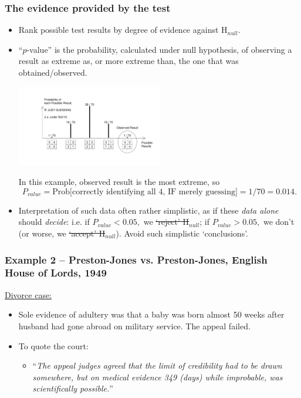 \documentclass{beamer}\usepackage[]{graphicx}\usepackage[]{color}
\begin{document}
\begin{frame}
\frametitle{The evidence provided by the test}

\begin{footnotesize}
\begin{itemize}
\item
Rank possible test
results by  degree of evidence against H$_{null}$. 
\item ``$p$-value'' is the probability, calculated under null hypothesis, of
observing a result as  extreme as, or more extreme than, the one that was obtained/observed.
\begin{center}
	\includegraphics[width=2.5in]{ProbResults.pdf}
\end{center}
\pause
In this example, observed result is the most extreme, so
$$P_{value}=\textrm{Prob[correctly identifying all 4, IF merely guessing]} = 1/70 = 0.014.$$ \pause
\item
Interpretation of such data  often  rather simplistic, as if these \textit{data alone} should \textit{decide}:  i.e. if $P_{value} < 0.05,$ we \sout{`reject' H}$_{null}$; if $P_{value} > 0.05,$ we don't (or worse, we \sout{`accept' H}$_{null}$). Avoid such simplistic `conclusions'.

\end{itemize}
\end{footnotesize}
\end{frame}

\begin{frame}
\frametitle{Example 2 -- Preston-Jones vs. Preston-Jones, English House of Lords, 1949}

\underline{Divorce case:}

\vspace*{.3in}

\begin{itemize}
	\item Sole evidence of adultery was that a baby was born almost 50 weeks after husband had gone abroad on military service.  The appeal failed.
	\item To quote the court: 
	\begin{itemize}
		\item ``\textit{The appeal judges agreed that the limit of credibility had to be drawn somewhere, but on medical 
evidence 349 (days) while improbable, was scientifically possible.}''
	\end{itemize}
\end{itemize}



\end{frame}
\end{document}
